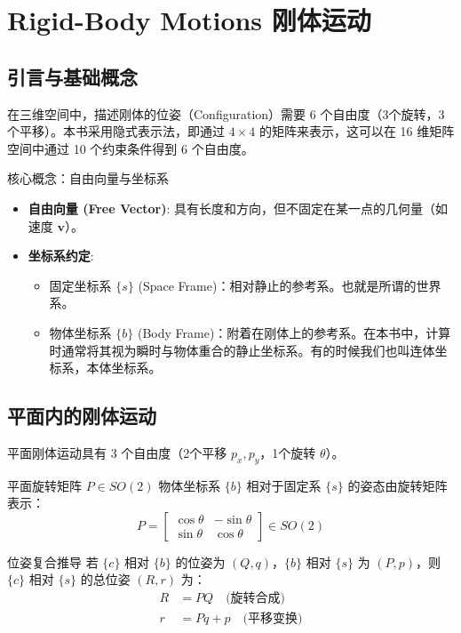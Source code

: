 \chapter{Rigid-Body Motions 刚体运动}

\section{引言与基础概念}
在三维空间中，描述刚体的位姿（Configuration）需要 6 个自由度（3个旋转，3个平移）。本书采用隐式表示法，即通过 $4 \times 4$ 的矩阵来表示，这可以在 16 维矩阵空间中通过 10 个约束条件得到 6 个自由度。

\begin{defbox}{核心概念：自由向量与坐标系}
\begin{itemize}
    \item \textbf{自由向量 (Free Vector)}: 具有长度和方向，但不固定在某一点的几何量（如速度 $\mathbf{v}$）。
    \item \textbf{坐标系约定}:
    \begin{itemize}
        \item 固定坐标系 $\{s\}$ (Space Frame)：相对静止的参考系。也就是所谓的世界系。
        \item 物体坐标系 $\{b\}$ (Body Frame)：附着在刚体上的参考系。在本书中，计算时通常将其视为瞬时与物体重合的静止坐标系。有的时候我们也叫连体坐标系，本体坐标系。
    \end{itemize}
\end{itemize}
\end{defbox}

\section{平面内的刚体运动}
平面刚体运动具有 3 个自由度（2个平移 $p_x, p_y$，1个旋转 $\theta$）。

\begin{formulabox}{平面旋转矩阵 $P \in SO(2)$}
物体坐标系 $\{b\}$ 相对于固定系 $\{s\}$ 的姿态由旋转矩阵表示：
\begin{equation}
P = \begin{bmatrix} \cos\theta & -\sin\theta \\ \sin\theta & \cos\theta \end{bmatrix} \in SO(2)
\end{equation}
\end{formulabox}

\begin{mybox}{位姿复合推导}
若 $\{c\}$ 相对 $\{b\}$ 的位姿为 $(Q, q)$，$\{b\}$ 相对 $\{s\}$ 为 $(P, p)$，则 $\{c\}$ 相对 $\{s\}$ 的总位姿 $(R, r)$ 为：
\begin{align}
R &= PQ \quad \text{(旋转合成)} \\
r &= Pq + p \quad \text{(平移变换)}
\end{align}
\end{mybox}

